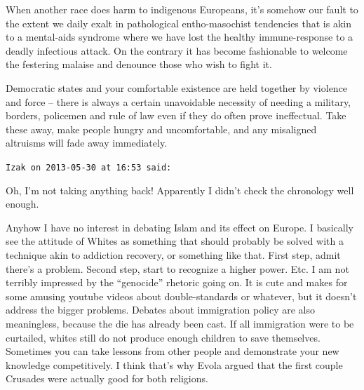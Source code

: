 \begin{footnotesize}
\begin{sffamily}
When another race does harm to indigenous Europeans, it's somehow our fault to the extent we daily exalt in pathological entho-masochist tendencies that is akin to a mental-aids syndrome where we have lost the healthy immune-response to a deadly infectious attack. On the contrary it has become fashionable to welcome the festering malaise and denounce those who wish to fight it.

Democratic states and your comfortable existence are held together by violence and force -- there is always a certain unavoidable necessity of needing a military, borders, policemen and rule of law even if they do often prove ineffectual. Take these away, make people hungry and uncomfortable, and any misaligned altruisms will fade away immediately.

\hfill

\texttt{Izak on 2013-05-30 at 16:53 said:}

Oh, I'm not taking anything back! Apparently I didn't check the chronology well enough.

Anyhow I have no interest in debating Islam and its effect on Europe. I basically see the attitude of Whites as something that should probably be solved with a technique akin to addiction recovery, or something like that. First step, admit there's a problem. Second step, start to recognize a higher power. Etc. I am not terribly impressed by the ``genocide'' rhetoric going on. It is cute and makes for some amusing youtube videos about double-standards or whatever, but it doesn't address the bigger problems. Debates about immigration policy are also meaningless, because the die has already been cast. If all immigration were to be curtailed, whites still do not produce enough children to save themselves. Sometimes you can take lessons from other people and demonstrate your new knowledge competitively. I think that's why Evola argued that the first couple Crusades were actually good for both religions.


\end{sffamily}
\end{footnotesize}

